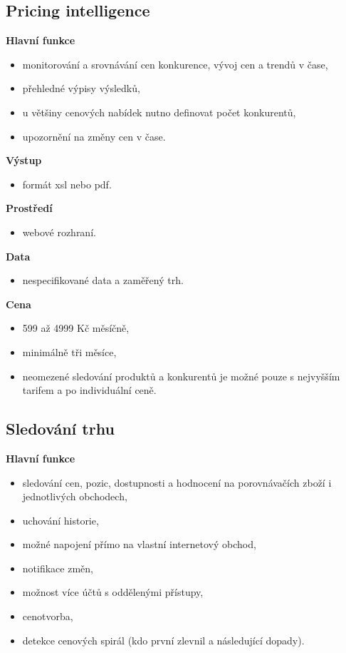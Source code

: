 \documentclass[thesis=B,czech]{FITthesis}[2012/06/26]
\begin{document}
\newpage

\subsection{Pricing intelligence~\cite{pricingIntelligence}} 

\textbf{Hlavní funkce}
\begin{itemize}
\item monitorování a srovnávání cen konkurence, vývoj cen a trendů v čase,
\item přehledné výpisy výsledků,
\item u většiny cenových nabídek nutno definovat počet konkurentů,
\item upozornění na změny cen v čase.
\end{itemize}

\textbf{Výstup}
\begin{itemize}
\item formát xsl nebo pdf.
\end{itemize}

\textbf{Prostředí}
\begin{itemize}
\item webové rozhraní.
\end{itemize}

\textbf{Data}
\begin{itemize}
\item nespecifikované data a zaměřený trh.
\end{itemize}

\textbf{Cena}
\begin{itemize}
\item 599 až 4999 Kč měsíčně,
\item minimálně tři měsíce,
\item neomezené sledování produktů a konkurentů je možné pouze s nejvyšším tarifem a po individuální ceně.
\end{itemize}


\subsection{Sledování trhu~\cite{sledovaniTrhu}} 
\textbf{Hlavní funkce}
\begin{itemize}
\item sledování cen, pozic, dostupnosti a hodnocení na porovnávačích zboží i jednotlivých obchodech,
\item uchování historie,
\item možné napojení přímo na vlastní internetový obchod,
\item notifikace změn,
\item možnost více účtů s oddělenými přístupy,
\item cenotvorba,
\item detekce cenových spirál (kdo první zlevnil a následující dopady).
\end{itemize}
\end{document}
